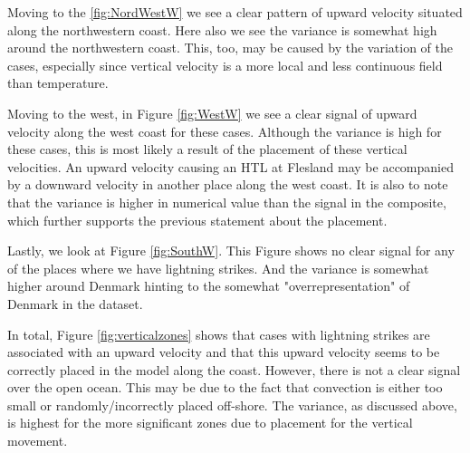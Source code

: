 Moving to the \ref{fig:NordWestW} we see a clear pattern of upward velocity situated along the northwestern coast. Here also we see the variance is somewhat high around the northwestern coast. This, too, may be caused by the variation of the cases, especially since vertical velocity is a more local and less continuous field than temperature. 

Moving to the west, in Figure \ref{fig:WestW} we see a clear signal of upward velocity along the west coast for these cases. Although the variance is high for these cases, this is most likely a result of the placement of these vertical velocities. An upward velocity causing an HTL at Flesland may be accompanied by a downward velocity in another place along the west coast. It is also to note that the variance is higher in numerical value than the signal in the composite, which further supports the previous statement about the placement. 

Lastly, we look at Figure \ref{fig:SouthW}. This Figure shows no clear signal for any of the places where we have lightning strikes. And the variance is somewhat higher around Denmark hinting to the somewhat "overrepresentation" of Denmark in the dataset. 

In total, Figure \ref{fig:verticalzones} shows that cases with lightning strikes are associated with an upward velocity and that this upward velocity seems to be correctly placed in the model along the coast. However, there is not a clear signal over the open ocean. This may be due to the fact that convection is either too small or randomly/incorrectly placed off-shore. The variance, as discussed above, is highest for the more significant zones due to placement for the vertical movement. 

